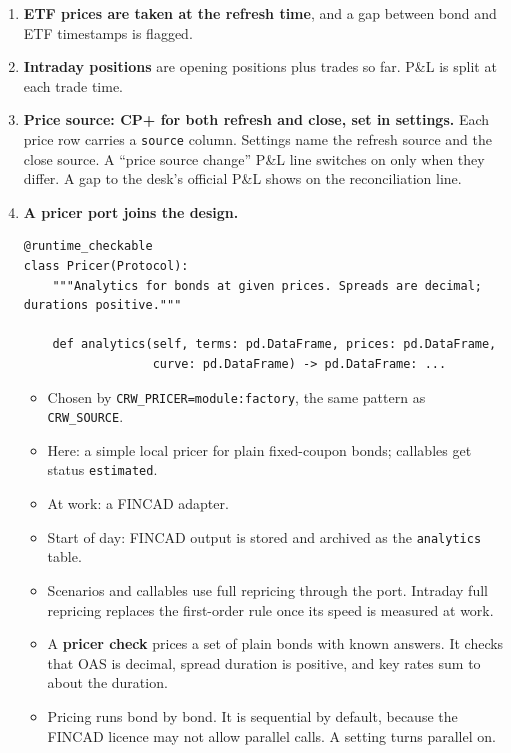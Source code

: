 \documentclass[11pt,a4paper]{article}
\newcommand{\code}[1]{\texttt{\small #1}}
\begin{document}
\begin{enumerate}
\item \textbf{ETF prices are taken at the refresh time}, and a gap between bond and ETF timestamps is flagged.
\item \textbf{Intraday positions} are opening positions plus trades so far. P\&L is split at each trade time.
\item \textbf{Price source: CP+ for both refresh and close, set in settings.} Each price row carries a \code{source} column. Settings name the refresh source and the close source. A ``price source change'' P\&L line switches on only when they differ. A gap to the desk's official P\&L shows on the reconciliation line.
\item \textbf{A pricer port joins the design.}
\begin{lstlisting}
@runtime_checkable
class Pricer(Protocol):
    """Analytics for bonds at given prices. Spreads are decimal; durations positive."""

    def analytics(self, terms: pd.DataFrame, prices: pd.DataFrame,
                  curve: pd.DataFrame) -> pd.DataFrame: ...
\end{lstlisting}
  \begin{itemize}
  \item Chosen by \code{CRW\_PRICER=module:factory}, the same pattern as \code{CRW\_SOURCE}.
  \item Here: a simple local pricer for plain fixed-coupon bonds; callables get status \code{estimated}.
  \item At work: a FINCAD adapter.
  \item Start of day: FINCAD output is stored and archived as the \code{analytics} table.
  \item Scenarios and callables use full repricing through the port. Intraday full repricing replaces the first-order rule once its speed is measured at work.
  \item A \textbf{pricer check} prices a set of plain bonds with known answers. It checks that OAS is decimal, spread duration is positive, and key rates sum to about the duration.
  \item Pricing runs bond by bond. It is sequential by default, because the FINCAD licence may not allow parallel calls. A setting turns parallel on.
  \end{itemize}
\end{enumerate}
\end{document}
